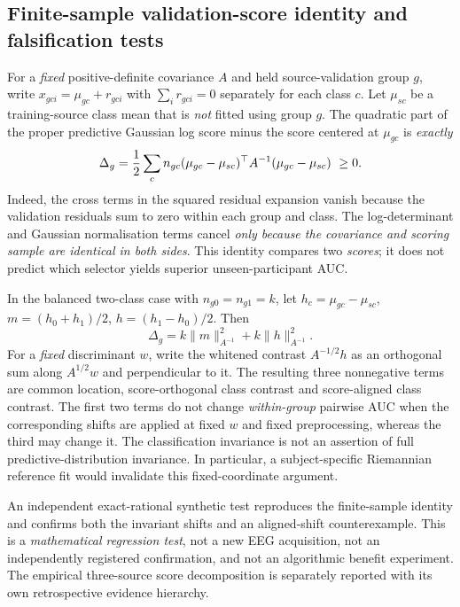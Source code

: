 \subsection{Finite-sample validation-score identity and falsification tests}
\label{sec:p1-rational-witness}
For a \emph{fixed} positive-definite covariance $A$ and
held source-validation group $g$, write
$x_{gci}=\mu_{gc}+r_{gci}$ with
$\sum_i r_{gci}=0$ separately for each class $c$.
Let $\mu_{sc}$ be a training-source class mean that is
\emph{not} fitted using group $g$. The quadratic
part of the proper predictive Gaussian log score minus
the score centered at $\mu_{gc}$ is \emph{exactly}
\[
 \Delta_g={1\over2}\sum_c n_{gc}
 (\mu_{gc}-\mu_{sc})^\top A^{-1}
 (\mu_{gc}-\mu_{sc})\ \ge 0.
\]
Indeed, the cross terms in the squared residual
expansion vanish because the validation residuals
sum to zero within each group and class. The
log-determinant and Gaussian normalisation terms
cancel \emph{only because the covariance and
scoring sample are identical in both sides}.
This identity compares two \emph{scores}; it
does not predict which selector yields superior
unseen-participant AUC.

In the balanced two-class case with $n_{g0}=n_{g1}=k$,
let $h_c=\mu_{gc}-\mu_{sc}$,
$m=(h_0+h_1)/2$, $h=(h_1-h_0)/2$.
Then
\[
 \Delta_g=k\|m\|^2_{A^{-1}}
 +k\|h\|^2_{A^{-1}}.
\]
For a \emph{fixed} discriminant $w$, write the whitened
contrast $A^{-1/2}h$ as an orthogonal sum along
$A^{1/2}w$ and perpendicular to it. The resulting
three nonnegative terms are common location,
score-orthogonal class contrast and score-aligned
class contrast. The first two terms do not
change \emph{within-group} pairwise AUC when the
corresponding shifts are applied at fixed $w$ and
fixed preprocessing, whereas the third may change it.
The classification invariance is not an assertion of
full predictive-distribution invariance. In particular,
a subject-specific Riemannian reference fit would
invalidate this fixed-coordinate argument.

An independent exact-rational synthetic test
reproduces the finite-sample identity and confirms
both the invariant shifts and an aligned-shift
counterexample. This is a \emph{mathematical regression
test}, not a new EEG acquisition, not an independently
registered confirmation, and not an algorithmic
benefit experiment. The empirical three-source
score decomposition is separately reported with
its own retrospective evidence hierarchy.
